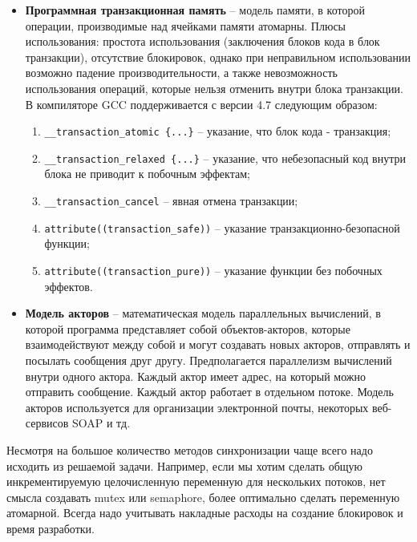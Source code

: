 \begin{itemize}
    \item\textbf{Программная транзакционная память} -- модель памяти, в которой операции, производимые над ячейками памяти атомарны. Плюсы использования: простота использования (заключения блоков кода в блок транзакции), отсутствие блокировок, однако при неправильном использовании возможно падение производительности, а также невозможность использования операций, которые нельзя отменить внутри блока транзакции. В компиляторе GCC поддерживается с версии 4.7 следующим образом: 
    \begin{enumerate}
        \item\texttt{\_\_transaction\_atomic \{...\}} -- указание, что блок кода - транзакция;
        \item\texttt{\_\_transaction\_relaxed \{...\}} -- указание, что небезопасный код внутри блока не приводит к побочным эффектам;
        \item\texttt{\_\_transaction\_cancel} -- явная отмена транзакции;
        \item\texttt{attribute((transaction\_safe))} -- указание тран\-зак\-ци\-он\-но-бе\-зо\-пас\-ной функции;
        \item\texttt{attribute((transaction\_pure))} -- указание функции без побочных эффектов.
    \end{enumerate}

    \item\textbf{Модель акторов} -- математическая модель параллельных вычислений, в которой программа представляет собой объектов-акторов, которые взаимодействуют между собой и могут создавать новых акторов, отправлять и посылать сообщения друг другу. Предполагается параллелизм вычислений внутри одного актора. Каждый актор имеет адрес, на который можно отправить сообщение. Каждый актор работает в отдельном потоке. Модель акторов используется для организации электронной почты, некоторых веб-сервисов SOAP и тд.
\end{itemize}

Несмотря на большое количество методов синхронизации чаще всего надо исходить из решаемой задачи. Например, если мы хотим сделать общую инкрементируемую целочисленную переменную для нескольких потоков, нет смысла создавать mutex или semaphore, более оптимально сделать переменную атомарной. Всегда надо учитывать накладные расходы на создание блокировок и время разработки.
